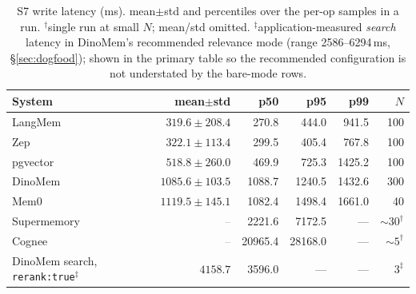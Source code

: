 \documentclass[11pt]{article}
\newcommand{\na}{\textcolor{gray}{--}}
\begin{document}
\begin{table}[t]
  \centering
  \small
  \caption{S7 write latency (ms). mean$\pm$std and percentiles over the per-op samples
  in a run. $^{\dagger}$single run at small $N$; mean/std omitted.
  $^{\ddagger}$application-measured \emph{search} latency in DinoMem's recommended
  relevance mode (range 2586--6294\,ms, \S\ref{sec:dogfood}); shown in the primary
  table so the recommended configuration is not understated by the bare-mode rows.}
  \label{tab:latency}
  \begin{tabular}{lrrrrr}
    \toprule
    System & mean$\pm$std & p50 & p95 & p99 & $N$ \\
    \midrule
    LangMem      & $319.6\pm208.4$ & 270.8 & 444.0 & 941.5 & 100 \\
    Zep          & $322.1\pm113.4$ & 299.5 & 405.4 & 767.8 & 100 \\
    pgvector     & $518.8\pm260.0$ & 469.9 & 725.3 & 1425.2 & 100 \\
    DinoMem      & $1085.6\pm103.5$ & 1088.7 & 1240.5 & 1432.6 & 300 \\
    Mem0         & $1119.5\pm145.1$ & 1082.4 & 1498.4 & 1661.0 & 40 \\
    Supermemory  & \na & 2221.6 & 7172.5 & --- & ${\sim}30^{\dagger}$ \\
    Cognee       & \na & 20965.4 & 28168.0 & --- & ${\sim}5^{\dagger}$ \\
    \midrule
    DinoMem search, \texttt{rerank:true}$^{\ddagger}$ & $4158.7$ & 3596.0 & --- & --- & $3^{\ddagger}$ \\
    \bottomrule
  \end{tabular}
\end{table}
\end{document}
